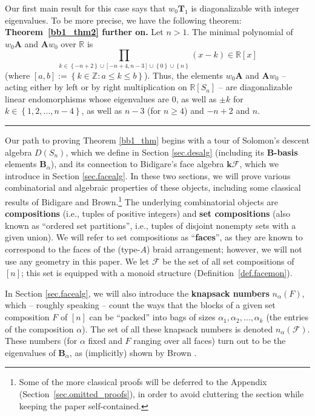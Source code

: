 \documentclass[12pt]{article}
\theoremstyle{definition}%
\newtheorem{thm}{Theorem}[section]
\theoremstyle{definition}%
\theoremstyle{remark}%
\newcommand{\tup}[1]{\left( #1 \right)}
\newcommand{\sbr}[1]{\left[ #1 \right]} %
\newcommand{\interval}[1]{\left[ #1 \right]} %
\newcommand{\set}[1]{\left\{ #1 \right\}}
\newcommand{\ZZ}{\mathbb{Z}}
\newcommand{\RR}{\mathbb{R}}
\newcommand{\kk}{\mathbf{k}}
\newcommand{\kf}{\kk\mathcal{F}}
\newcommand{\dsn}{D\left(S_n\right)}
\newcommand{\A}{\mathbf{A}}
\newcommand{\BBa}{\mathbf{B}_{\alpha}}
\newcommand{\TT}{\mathbf{T}}
\newcommand{\CF}{\mathcal{F}}
\newcommand{\wo}{w_0} %
\newcommand{\na}{n_{ \alpha } }%
\newcommand{\defin}[1]{\textbf{#1}}
\newenvironment{thm}[1][Theorem]{\noindent\textbf{#1.} }{\ \rule{0.5em}{0.5em}}
\begin{document}
Our first main result for this case says that $ \wo\TT_1 $ is diagonalizable with integer eigenvalues. To be more precise, we have the following theorem:
\begin{thm}[Theorem~\ref{bb1_thm2} further on]
    \label{bb1_thm}
    Let $n > 1$. The minimal polynomial of $ \wo\A $ and $ \A\wo $ over $\RR$ is
    \begin{equation}
    \label{bb1_thm.eq}
    \prod_{k \in \set{-n+2} \cup \interval{-n+4, n-3} \cup \set{0} \cup \set{n}} \tup{x-k} \in \RR\sbr{x}
    \end{equation}
(where $\interval{a,b} := \set{k \in \ZZ : a \le k \le b}$).
Thus, the elements $\wo\A$ and $\A\wo$ -- acting either by left or by right multiplication on $\RR[S_n]$ -- are diagonalizable linear endomorphisms whose eigenvalues are $0$, as well as $\pm k$ for $k \in \set{1,2,\ldots,n-4}$, as well as $n-3$ (for $n \geq 4$) and $-n+2$ and $n$.
\end{thm}


Our path to proving Theorem \ref{bb1_thm} begins with a tour of Solomon's descent algebra $\dsn$, which we define in Section \ref{sec.desalg} (including its \defin{B-basis} elements $\BBa$), and its connection to Bidigare's face algebra $ \kf $, which we introduce in Section \ref{sec.facealg}.
In these two sections, we will prove various combinatorial and algebraic properties of these objects, including some classical results of Bidigare and Brown.\footnote{Some of the more classical proofs will be deferred to the Appendix (Section~\ref{sec.omitted_proofs}), in order to avoid cluttering the section while keeping the paper self-contained.}
The underlying combinatorial objects are \defin{compositions} (i.e., tuples of positive integers) and \defin{set compositions} (also known as ``ordered set partitions'', i.e., tuples of disjoint nonempty sets with a given union).
We will refer to set compositions as ``\defin{faces}'', as they are known to correspond to the faces of the (type-$A$) braid arrangement; however, we will not use any geometry in this paper.
We let $\CF$ be the set of all set compositions of $\interval{n}$; this set is equipped with a monoid structure (Definition~\ref{def.facemon}).

In Section \ref{sec.facealg}, we will also introduce the \defin{knapsack numbers} $ \na\tup{ F } $, which -- roughly speaking -- count the ways that the blocks of a given set composition $F$ of $ \interval{n}$ can be ``packed'' into bags of sizes $ \alpha_1, \alpha_2, \ldots, \alpha_k $ (the entries of the composition $\alpha$).
The set of all these knapsack numbers is denoted $ \na\tup{ \CF } $.
These numbers (for $\alpha$ fixed and $F$ ranging over all faces) turn out to be the eigenvalues of $\BBa$, as (implicitly) shown by Brown \cite[Theorem 4.1]{Schocker}.
\end{document}
